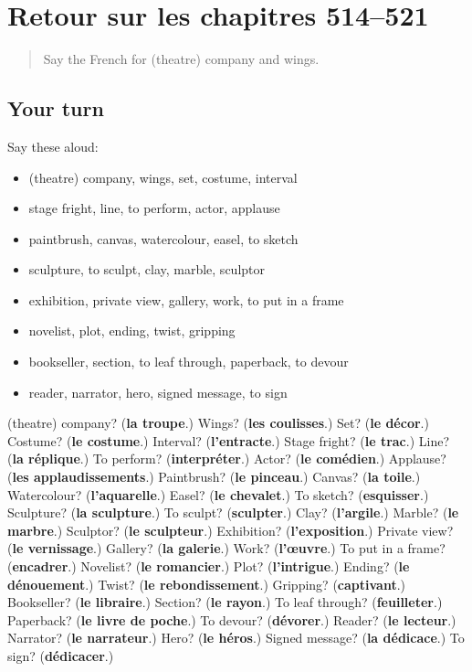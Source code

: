 \section[(dialogue)]{Retour sur les chapitres 514–521}

\label{lesson:FR-R521-revision-514-521}



\begin{quote}
Say the French for (theatre) company and wings.
\end{quote}

\subsection*{Your turn}
Say these aloud:

\begin{itemize}
\raggedright
  \item (theatre) company, wings, set, costume, interval
  \item stage fright, line, to perform, actor, applause
  \item paintbrush, canvas, watercolour, easel, to sketch
  \item sculpture, to sculpt, clay, marble, sculptor
  \item exhibition, private view, gallery, work, to put in a frame
  \item novelist, plot, ending, twist, gripping
  \item bookseller, section, to leaf through, paperback, to devour
  \item reader, narrator, hero, signed message, to sign
\end{itemize}

\begin{tcolorbox}[breakable,colback=teal!4,colframe=teal!35!black,title={Before you move on}]
(theatre) company? (\textbf{la troupe}.) Wings? (\textbf{les coulisses}.) Set? (\textbf{le décor}.) Costume? (\textbf{le costume}.) Interval? (\textbf{l'entracte}.) Stage fright? (\textbf{le trac}.) Line? (\textbf{la réplique}.) To perform? (\textbf{interpréter}.) Actor? (\textbf{le comédien}.) Applause? (\textbf{les applaudissements}.) Paintbrush? (\textbf{le pinceau}.) Canvas? (\textbf{la toile}.) Watercolour? (\textbf{l'aquarelle}.) Easel? (\textbf{le chevalet}.) To sketch? (\textbf{esquisser}.) Sculpture? (\textbf{la sculpture}.) To sculpt? (\textbf{sculpter}.) Clay? (\textbf{l'argile}.) Marble? (\textbf{le marbre}.) Sculptor? (\textbf{le sculpteur}.) Exhibition? (\textbf{l'exposition}.) Private view? (\textbf{le vernissage}.) Gallery? (\textbf{la galerie}.) Work? (\textbf{l'œuvre}.) To put in a frame? (\textbf{encadrer}.) Novelist? (\textbf{le romancier}.) Plot? (\textbf{l'intrigue}.) Ending? (\textbf{le dénouement}.) Twist? (\textbf{le rebondissement}.) Gripping? (\textbf{captivant}.) Bookseller? (\textbf{le libraire}.) Section? (\textbf{le rayon}.) To leaf through? (\textbf{feuilleter}.) Paperback? (\textbf{le livre de poche}.) To devour? (\textbf{dévorer}.) Reader? (\textbf{le lecteur}.) Narrator? (\textbf{le narrateur}.) Hero? (\textbf{le héros}.) Signed message? (\textbf{la dédicace}.) To sign? (\textbf{dédicacer}.)
\end{tcolorbox}
